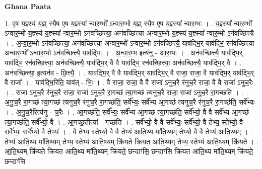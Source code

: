 \documentclass[17pt]{extarticle}
\begin{document}
\textbf{Ghana Paata } \newline

1. ए॒ष य॒ज्ञ्स्य॑ य॒ज्ञ् स्यै॒ष ए॒ष य॒ज्ञ्स्या᳚ न्वार॒म्भो᳚ ऽन्वार॒म्भो य॒ज्ञ् स्यै॒ष ए॒ष य॒ज्ञ्स्या᳚ न्वार॒म्भः । . य॒ज्ञ्स्या᳚ न्वार॒म्भो᳚ ऽन्वार॒म्भो य॒ज्ञ्स्य॑ य॒ज्ञ्स्या᳚ न्वार॒म्भो ऽन॑वच्छित्त्या॒ अन॑वच्छित्त्या अन्वार॒म्भो य॒ज्ञ्स्य॑ य॒ज्ञ्स्या᳚ न्वार॒म्भो ऽन॑वच्छित्त्यै । . अ॒न्वा॒र॒म्भो ऽन॑वच्छित्त्या॒ अन॑वच्छित्त्या अन्वार॒म्भो᳚ ऽन्वार॒म्भो ऽन॑वच्छित्त्यै॒ याव॑द्भि॒र् याव॑द्भि॒ रन॑वच्छित्त्या अन्वार॒म्भो᳚ ऽन्वार॒म्भो ऽन॑वच्छित्त्यै॒ याव॑द्भिः । . अ॒न्वा॒र॒म्भ इत्य॑नु - आ॒र॒म्भः । . अन॑वच्छित्त्यै॒ याव॑द्भि॒र् याव॑द्भि॒ रन॑वच्छित्त्या॒ अन॑वच्छित्त्यै॒ याव॑द्भि॒र् वै वै याव॑द्भि॒ रन॑वच्छित्त्या॒ अन॑वच्छित्त्यै॒ याव॑द्भि॒र् वै । . अन॑वच्छित्त्या॒ इत्यन॑व - छि॒त्त्यै॒ । . याव॑द्भि॒र् वै वै याव॑द्भि॒र् याव॑द्भि॒र् वै राजा॒ राजा॒ वै याव॑द्भि॒र् याव॑द्भि॒र् वै राजा᳚ । . याव॑द्भि॒रिति॒ याव॑त् - भिः॒ । . वै राजा॒ राजा॒ वै वै राजा॑ ऽनुच॒रै र॑नुच॒रै राजा॒ वै वै राजा॑ ऽनुच॒रैः । . राजा॑ ऽनुच॒रै र॑नुच॒रै राजा॒ राजा॑ ऽनुच॒रै रा॒गच्छ॑ त्या॒गच्छ॑ त्यनुच॒रै राजा॒ राजा॑ ऽनुच॒रै रा॒गच्छ॑ति । . अ॒नु॒च॒रै रा॒गच्छ॑ त्या॒गच्छ॑ त्यनुच॒रै र॑नुच॒रै रा॒गच्छ॑ति॒ सर्वे᳚भ्यः॒ सर्वे᳚भ्य आ॒गच्छ॑ त्यनुच॒रै र॑नुच॒रै रा॒गच्छ॑ति॒ सर्वे᳚भ्यः । . अ॒नु॒च॒रैरित्य॑नु - च॒रैः । . आ॒गच्छ॑ति॒ सर्वे᳚भ्यः॒ सर्वे᳚भ्य आ॒गच्छ॑ त्या॒गच्छ॑ति॒ सर्वे᳚भ्यो॒ वै वै सर्वे᳚भ्य आ॒गच्छ॑ त्या॒गच्छ॑ति॒ सर्वे᳚भ्यो॒ वै । . आ॒गच्छ॒तीत्या᳚ - गच्छ॑ति । . सर्वे᳚भ्यो॒ वै वै सर्वे᳚भ्यः॒ सर्वे᳚भ्यो॒ वै तेभ्य॒ स्तेभ्यो॒ वै सर्वे᳚भ्यः॒ सर्वे᳚भ्यो॒ वै तेभ्यः॑ । . वै तेभ्य॒ स्तेभ्यो॒ वै वै तेभ्य॑ आति॒थ्य मा॑ति॒थ्यम् तेभ्यो॒ वै वै तेभ्य॑ आति॒थ्यम् । . तेभ्य॑ आति॒थ्य मा॑ति॒थ्यम् तेभ्य॒ स्तेभ्य॑ आति॒थ्यम् क्रि॑यते क्रियत आति॒थ्यम् तेभ्य॒ स्तेभ्य॑ आति॒थ्यम् क्रि॑यते । . आ॒ति॒थ्यम् क्रि॑यते क्रियत आति॒थ्य मा॑ति॒थ्यम् क्रि॑यते॒ छन्दाꣳ॑सि॒ छन्दाꣳ॑सि क्रियत आति॒थ्य मा॑ति॒थ्यम् क्रि॑यते॒ छन्दाꣳ॑सि । \newline
\end{document}
